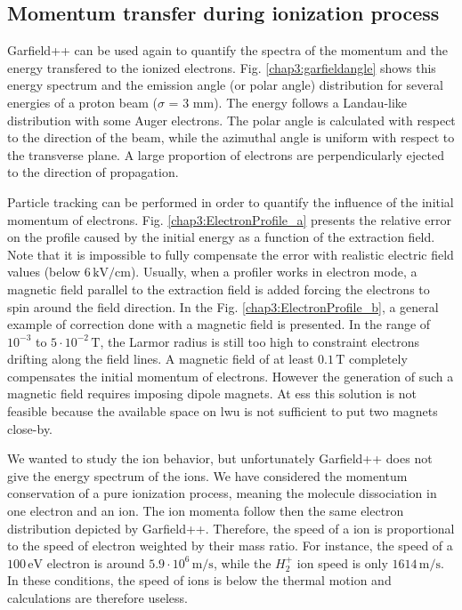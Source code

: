 \begin{refsection}
  \subsection{Momentum transfer during ionization process}
  Garfield++ can be used again to quantify the spectra of the momentum and the energy transfered to the ionized electrons. Fig. \ref{chap3:garfieldangle} shows this energy spectrum and the emission angle (or polar angle) distribution for several energies of a proton beam ($\sigma$ = 3 mm). The energy follows a Landau-like distribution with some Auger electrons. The polar angle is calculated with respect to the direction of the beam, while the azimuthal angle is uniform with respect to the transverse plane. A large proportion of electrons are perpendicularly ejected to the direction of propagation.

  

  Particle tracking can be performed in order to quantify the influence of the initial momentum of electrons. Fig. \ref{chap3:ElectronProfile_a} presents the relative error on the profile caused by the initial energy as a function of the extraction field. Note that it is impossible to fully compensate the error with realistic electric field values (below $6\,\mathrm{kV/cm}$). Usually, when a profiler works in electron mode, a magnetic field parallel to the extraction field is added forcing the electrons to spin around the field direction. In the Fig. \ref{chap3:ElectronProfile_b}, a general example of correction done with a magnetic field is presented. In the range of $10^{-3}$ to $5\cdot10^{-2}\,\mathrm{T}$, the Larmor radius is still too high to constraint electrons drifting along the field lines.
  A magnetic field of at least $0.1\,\mathrm{T}$ completely compensates the initial momentum of electrons. However the generation of such a magnetic field requires imposing dipole magnets. At \acrshort{ess} this solution is not feasible because the available space on \acrshort{lwu} is not sufficient to put two magnets close-by.

  

  We wanted to study the ion behavior, but unfortunately Garfield++ does not give the energy spectrum of the ions.
  We have considered the momentum conservation of a pure ionization process, meaning the molecule dissociation in one electron and an ion. The ion momenta follow then the same electron distribution depicted by Garfield++. Therefore, the speed of a ion is proportional to the speed of electron weighted by their mass ratio. For instance, the speed of a $100\,\mathrm{eV}$ electron is around $5.9\cdot10^{6}\,\mathrm{m/s}$, while the $H_{2}^{+}$ ion speed is only $1614\,\mathrm{m/s}$. In these conditions, the speed of ions is below the thermal motion and calculations are therefore useless.



\end{refsection}
